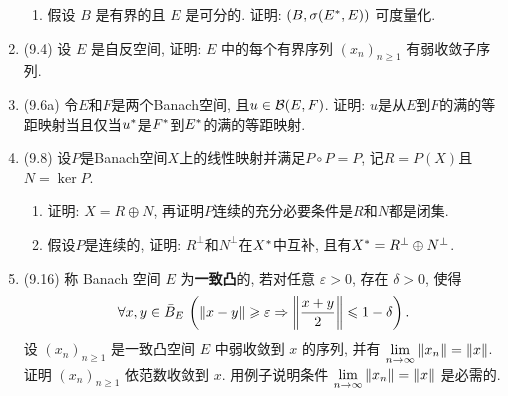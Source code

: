 \begin{enumerate}[label=\textbf{\arabic*.}, ref=\arabic*]
\begin{enumerate}[(1)]
            \item 假设 $ B $ 是有界的且 $ E $ 是可分的. 证明: $ (B, \sigma(E^{*}, E)) $ 可度量化.
        \end{enumerate}
        \item (9.4) 设 $ E $ 是自反空间, 证明: $ E $ 中的每个有界序列 $ (x_{n})_{n\geqslant1} $ 有弱收敛子序列.
        \item (9.6a) 令$ E $和$ F $是两个Banach空间, 且$ u\in\mathcal{B}(E,F) $. 证明: $ u $是从$ E $到$ F $的满的等距映射当且仅当$ u^{*} $是$ F^{*} $到$ E^{*} $的满的等距映射.
        \item (9.8) 设$ P $是Banach空间$ X $上的线性映射并满足$ P\circ P=P $, 记$ R=P(X) $且$ N=\ker P $.
        \begin{enumerate}[(1)]
            \item 证明: $ X=R\oplus N $, 再证明$ P $连续的充分必要条件是$ R $和$ N $都是闭集.
            \item 假设$ P $是连续的, 证明: $ R^\bot $和$ N^\bot $在$ X^{*} $中互补, 且有$ X^{*}=R^\bot\oplus N^\bot $.
        \end{enumerate}
        \item (9.16) 称 Banach 空间 $ E $ 为\textbf{一致凸}的, 若对任意 $ \varepsilon>0 $, 存在 $ \delta>0 $, 使得
        \[
            \forall x, y\in\bar{B}_{E}\,\left(\left\| x-y \right\|\geqslant\varepsilon\Rightarrow \left\| \frac{x+y}{2} \right\|\leqslant 1-\delta\right).
        \]
        设 $ (x_{n})_{n\geqslant1} $ 是一致凸空间 $ E $ 中弱收敛到 $ x $ 的序列, 并有 $ \lim\limits_{n\to\infty}\left\| x_{n} \right\|=\left\| x \right\| $. 证明 $ (x_{n})_{n\geqslant1} $ 依范数收敛到 $ x $. 用例子说明条件 $ \lim\limits_{n\to\infty}\left\| x_{n} \right\|=\left\| x \right\| $ 是必需的.
    \end{enumerate}